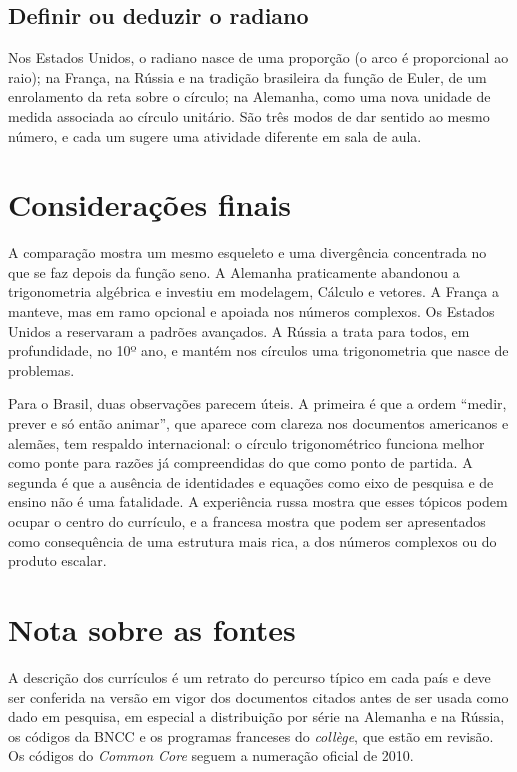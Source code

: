 \documentclass[
    article,
    12pt,
    a4paper,
    sumario=tradicional
]{abntex2}
\begin{document}
\subsection{Definir ou deduzir o radiano}
 Nos Estados Unidos, o radiano nasce
de uma proporção (o arco é proporcional ao raio); na França, na Rússia e na
tradição brasileira da função de Euler, de um enrolamento da reta sobre o
círculo; na Alemanha, como uma nova unidade de
medida associada ao círculo unitário. São três modos de dar sentido ao mesmo
número, e cada um sugere uma atividade diferente em sala de aula.

\section{Considerações finais}

A comparação mostra um mesmo esqueleto e uma divergência concentrada no que se
faz depois da função seno. A Alemanha praticamente abandonou a trigonometria
algébrica e investiu em modelagem, Cálculo e vetores. A França a manteve, mas
em ramo opcional e apoiada nos números complexos. Os Estados Unidos a
reservaram a padrões avançados. A Rússia a trata para todos, em profundidade,
no 10º ano, e mantém nos círculos uma trigonometria que nasce de problemas.

Para o Brasil, duas observações parecem úteis. A primeira é que a ordem
``medir, prever e só então animar'', que aparece com clareza nos documentos
americanos e alemães, tem respaldo internacional: o círculo trigonométrico
funciona melhor como ponte para razões já compreendidas do que como ponto de
partida. A segunda é que a ausência de identidades e equações como eixo de
pesquisa e de ensino não é uma fatalidade. A experiência russa mostra que esses
tópicos podem ocupar o centro do currículo, e a francesa mostra que podem ser
apresentados como consequência de uma estrutura mais rica, a dos números
complexos ou do produto escalar.

\section*{Nota sobre as fontes}

A descrição dos currículos é um retrato do percurso típico em cada país e
deve ser conferida na versão em vigor dos documentos citados antes de ser usada
como dado em pesquisa, em especial a distribuição por série na Alemanha e na
Rússia, os códigos da BNCC e os programas franceses do \textit{collège}, que estão
em revisão. Os códigos do \textit{Common Core} seguem a numeração oficial de 2010.

\postextual


\end{document}
